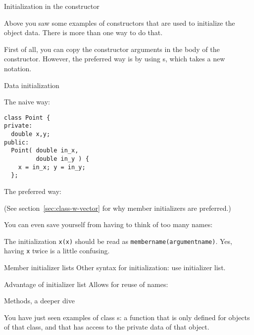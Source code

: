  {Initialization in the constructor}


Above you saw some examples of constructors that are used
to initialize the object data.
There is more than one way to do that.

First of all, you can copy the constructor arguments
in the body of the constructor.
However, the preferred way is by using s,
which takes a new notation.

\begin{block}{Data initialization}
  \label{sl:contructor-init-2}
\begin{multicols}{2}
The naive way:
  \lstset{style=snippetcode}
\begin{lstlisting}
class Point {
private:
  double x,y;
public:
  Point( double in_x,
         double in_y ) {
    x = in_x; y = in_y;
  };
\end{lstlisting}
\columnbreak
The preferred way:
\end{multicols}
\end{block}

(See section~\ref{sec:class-w-vector} for why member initializers are preferred.)

You can even save yourself from having to think of too many names:


The initialization \lstinline{x(x)} should be read as
\lstinline{membername(argumentname)}.
Yes, having \lstinline{x} twice is a little confusing.

\begin{slide}{Member initializer lists}
  \label{sl:class-init}
  Other syntax for initialization:\slidenewline
  use initializer list.
\end{slide}

\begin{slide}{Advantage of initializer list}
  \label{sl:class-init-why}
  Allows for reuse of names:
\end{slide}

 {Methods, a deeper dive}

You have just seen examples of class
s: a function that is only defined for objects of
that class, and that has access to the private data of that object.

